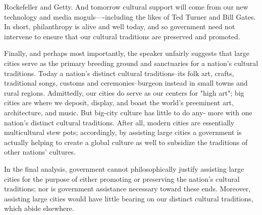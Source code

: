 Rockefeller and Getty.
And tomorrow cultural support will come from our new technology and media moguls----including the likes of Ted Turner and Bill Gates.
In short, philanthropy is alive and well today, and so government need not intervene to ensure that our cultural traditions are preserved and promoted.


Finally, and perhaps most importantly, the speaker unfairly suggests that large cities serve as the primary breeding ground and sanctuaries for a nation's cultural traditions.
Today a nation's distinct cultural traditions--its folk art, crafts, traditional songs, customs and ceremonies--burgeon instead in small towns and rural regions.
Admittedly, our cities do serve as our centers for "high art"; big cities are where we deposit, display, and boast the world's preeminent art, architecture, and music.
But big-city culture has little to do any- more with one nation's distinct cultural traditions.
After all, modern cities are essentially multicultural stew pots; accordingly, by assisting large cities a government is actually helping to create a global culture as well to subsidize the traditions of other nations' cultures.


In the final analysis, government cannot philosophically justify assisting large cities for the purpose of either promoting or preserving the nation's cultural traditions; nor is government assistance necessary toward these ends.
Moreover, assisting large cities would have little bearing on our distinct cultural traditions, which abide elsewhere.
